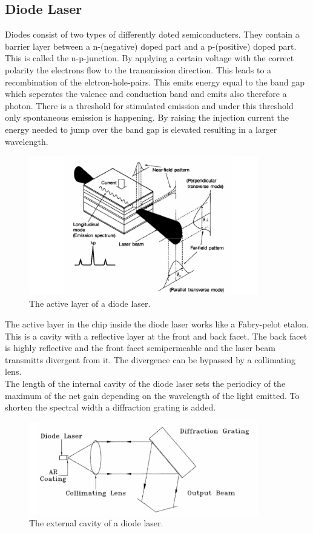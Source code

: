 \subsection{Diode Laser}
Diodes consist of two types of differently doted semiconducters. They contain a barrier layer between a n-(negative) doped part and a p-(positive) doped part. This is called the n-p-junction. By applying a certain voltage with the correct polarity the electrons flow to the transmission direction. This leads to a recombination of the elctron-hole-pairs. This emits energy equal to the band gap which seperates the valence and conduction band and emits also therefore a photon. There is a threshold for stimulated emission and under this threshold only spontaneous emission is happening. By raising the injection current the energy needed to jump over the band gap is elevated resulting in a larger wavelength.\\
\begin{figure}[H]
    \centering
    \includegraphics[width=10cm]{content/active_layer.png}
    \caption{The active layer of a diode laser.}
\end{figure}
The active layer in the chip inside the diode laser works like a Fabry-pelot etalon. This is a cavity with a reflective layer at the front and back facet. The back facet is highly reflective and the front facet semipermeable and the laser beam transmitts divergent from it. The divergence can be bypassed by a collimating lens.\\
The length of the internal cavity of the diode laser sets the periodicy of the maximum of the net gain depending on the wavelength of the light emitted. To shorten the spectral width a diffraction grating is added.\\
\begin{figure}[H]
    \centering
    \includegraphics[width=10cm]{content/external_cavity.png}
    \caption{The external cavity of a diode laser.}
\end{figure}
